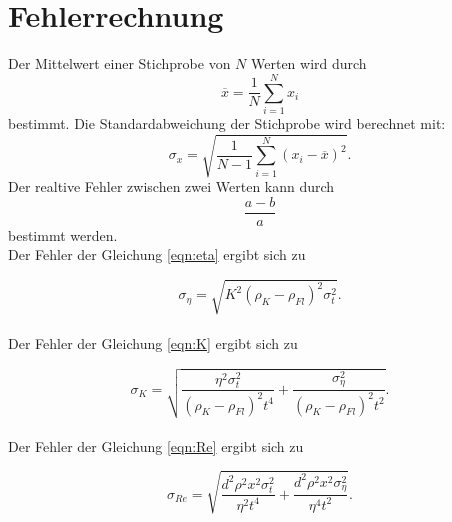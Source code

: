 \section{Fehlerrechnung}

Der Mittelwert einer Stichprobe von $N$ Werten wird durch
\begin{equation}
    \overline{x} = \frac{1}{N} \sum_{i=1}^N x_i
    \label{eqn:mittelwert}
\end{equation}
bestimmt.
\newline
Die Standardabweichung der Stichprobe wird berechnet mit:
\begin{equation*}
    \sigma_x = \sqrt{\frac{1}{N-1} \sum_{i=1}^N (x_i - \overline{x})^2}.
    \label{eqn:standard}
\end{equation*}
\newline
Der realtive Fehler zwischen zwei Werten kann durch
\begin{equation*}
    \frac{a-b}{a}
\end{equation*}
bestimmt werden.
\\
\noindent Der Fehler der Gleichung \ref{eqn:eta} ergibt sich zu 

\begin{equation}
    \sigma_{\eta} = \sqrt{K^{2} \left(\rho_{K}-\rho_{Fl}\right)^{2} \sigma_{t}^{2}}.
    \label{eqn:erreta}
\end{equation}
\\
\noindent Der Fehler der Gleichung \ref{eqn:K} ergibt sich zu 

\begin{equation}
    \sigma_{K} = \sqrt{\frac{\eta^{2} \sigma_{t}^{2}}{\left(\rho_{K}-\rho_{Fl}\right)^{2} t^{4}} + \frac{\sigma_{\eta}^{2}}{\left(\rho_{K}-\rho_{Fl}\right)^{2}t^{2}}}.
    \label{eqn:errK}
\end{equation}
\\
\noindent Der Fehler der Gleichung \ref{eqn:Re} ergibt sich zu 

\begin{equation}
    \sigma_{Re} = \sqrt{\frac{d^{2} \rho^{2} x^{2} \sigma_{t}^{2} }{\eta^{2} t^{4}} + \frac{d^{2} \rho^{2} x^{2} \sigma_{\eta}^{2}}{\eta^{4} t^{2}}}.
    \label{eqn:errRe}
\end{equation}
